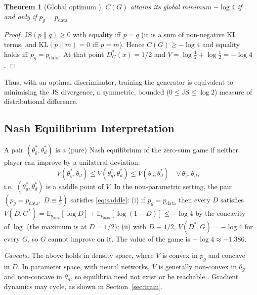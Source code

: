 \documentclass[conference]{IEEEtran}
\newcommand{\E}{\mathbb{E}}
\newcommand{\pdata}{p_{\mathrm{data}}}
\newcommand{\pg}{p_{g}}
\newcommand{\thg}{\theta_g}
\newcommand{\thd}{\theta_d}
\newcommand{\JS}{\mathrm{JS}}
\newcommand{\KL}{\mathrm{KL}}
\theoremstyle{plain}
\newtheorem{theorem}{Theorem}
\theoremstyle{definition}
\begin{document}
\begin{theorem}[Global optimum \cite{goodfellow2014gan}]
$C(G)$ attains its global minimum $-\log4$ if and only if $\pg=\pdata$.
\end{theorem}
\begin{proof}
$\JS(p\|q)\ge0$ with equality iff $p=q$ (it is a sum of non-negative KL terms, and $\KL(p\|m)=0$ iff $p=m$). Hence $C(G)\ge-\log4$ and equality holds iff $\pg=\pdata$. At that point $D^*_G(x)=1/2$ and $V=\log\tfrac12+\log\tfrac12=-\log4$.
\end{proof}

Thus, with an optimal discriminator, training the generator is equivalent to minimising the JS divergence, a symmetric, bounded ($0\le\JS\le\log2$) measure of distributional difference.

\subsection{Nash Equilibrium Interpretation}
A pair $(\thg^*,\thd^*)$ is a (pure) Nash equilibrium of the zero-sum game if neither player can improve by a unilateral deviation:
\begin{equation}
V(\thg^*,\thd)\le V(\thg^*,\thd^*)\le V(\thg,\thd^*)\quad\forall\,\thg,\thd,
\label{eq:saddle}
\end{equation}
i.e.\ $(\thg^*,\thd^*)$ is a saddle point of $V$. In the non-parametric setting, the pair $(\pg=\pdata,\;D\equiv\tfrac12)$ satisfies \eqref{eq:saddle}: (i) if $\pg=\pdata$ then every $D$ satisfies $V(D,G^*)=\E_{\pdata}[\log D]+\E_{\pdata}[\log(1-D)]\le-\log4$ by the concavity of $\log$ (the maximum is at $D=1/2$); (ii) with $D\equiv1/2$, $V(D^*,G)=-\log4$ for every $G$, so $G$ cannot improve on it. The value of the game is $-\log4\approx-1.386$.

\emph{Caveats.} The above holds in density space, where $V$ is convex in $\pg$ and concave in $D$. In parameter space, with neural networks, $V$ is generally non-convex in $\thg$ and non-concave in $\thd$, so equilibria need not exist or be reachable \cite{mescheder2018converge}. Gradient dynamics may cycle, as shown in Section~\ref{sec:train}.
\end{document}
